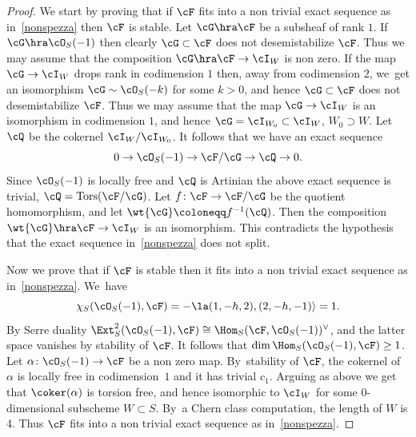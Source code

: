 \begin{proof}
We start by proving that if $\cF$ fits into a non trivial exact sequence as in~\eqref{nonspezza} then $\cF$ is stable. Let $\cG\hra\cF$ be a subsheaf of rank $1$. If
$\cG\hra\cO_S(-1)$ then clearly $\cG\subset\cF$ does not desemistabilize $\cF$. Thus we may assume that the composition
$\cG\hra\cF\to \cI_W$ is non zero. If the map $\cG\to \cI_W$ drops rank in codimension $1$ then, away from codimension $2$, we~get an isomorphism $\cG\sim\cO_S(-k)$ for some $k>0$, and hence $\cG\subset\cF$ does not desemistabilize $\cF$. Thus we may assume that the map $\cG\to \cI_W$ is an isomorphism in codimension $1$, and hence $\cG=\cI_{W_0}\subset \cI_W$, \ie $W_0\supset W$. Let $\cQ$ be the cokernel $\cI_W/ \cI_{W_0}$. It follows that we have an exact sequence
\begin{equation*}
0\to\cO_S(-1)\to\cF/\cG\to \cQ\to 0.
\end{equation*}
Since $\cO_S(-1)$ is locally free and $\cQ$ is Artinian the above exact sequence is trivial, \ie $\cQ=\mathrm{Tors}(\cF/\cG)$. Let $f\colon\cF\to \cF/\cG$ be the quotient homomorphism, and let $\wt{\cG}\coloneqq f^{-1}(\cQ)$. Then the composition
$\wt{\cG}\hra\cF\to \cI_W$ is an isomorphism. This contradicts the hypothesis that the exact sequence in~\eqref{nonspezza} does not split.

Now we prove that if $\cF$ is stable then it fits into a non trivial exact sequence as in~\eqref{nonspezza}. We~have
\begin{equation*}
\chi_S(\cO_S(-1),\cF)=-\la (1,-h,2),(2,-h,-1)\rangle=1.
\end{equation*}
By Serre duality $\Ext^2_S(\cO_S(-1),\cF)\cong \Hom_S(\cF,\cO_S(-1))^{\vee}$, and the latter space vanishes by stability of $\cF$. It follows that
$\dim\Hom_S(\cO_S(-1),\cF)\ge 1$.
Let $\alpha\colon\cO_S(-1)\to\cF$ be a non zero map. By~stability of $\cF$, the
cokernel of $\alpha$ is locally free in codimension~$1$ and it has trivial $c_1$. Arguing as above we get that $\coker(\alpha)$ is torsion free, and hence isomorphic to $\cI_{W}$ for some $0$-dimensional subscheme $W\subset S$. By~a Chern class computation, the length of $W$ is $4$. Thus $\cF$
fits into a non trivial exact sequence as in~\eqref{nonspezza}.
\end{proof}

